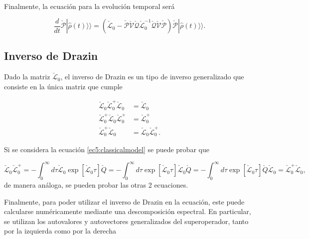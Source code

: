 \begin{appendixs}
Finalmente, la ecuación para la evolución temporal será 

\begin{equation*}
    \frac{d}{dt}\check{\mathcal{P}}|\hat{\rho}(t)\rangle \rangle = (\check{\mathcal{L}}_{0} - \check{\mathcal{P}}\check{\mathcal{V}}\check{\mathcal{Q}}\check{\mathcal{L}}^{-1}_{0}\check{\mathcal{Q}}\check{\mathcal{V}}\check{\mathcal{P}})\check{\mathcal{P}}|\hat{\rho}(t)\rangle \rangle. 
\end{equation*}



\label{appendix5clasic}

\subsection{ Inverso de Drazin }
Dado la matriz $\check{\mathcal{L}}_{0}$, el inverso de Drazin es un tipo de inverso generalizado que consiste en la única matriz que cumple 

\begin{align*}
    \check{\mathcal{L}}_{0}\check{\mathcal{L}}_{0}^{+}\check{\mathcal{L}}_{0} & = \check{\mathcal{L}}_{0} \\
    \check{\mathcal{L}}_{0}^{+}\check{\mathcal{L}}_{0}\check{\mathcal{L}}_{0}^{+} & = \check{\mathcal{L}}_{0}^{+} \\
    \check{\mathcal{L}}_{0}^{+}\check{\mathcal{L}}_{0} & = \check{\mathcal{L}}_{0}\check{\mathcal{L}}_{0}^{+}.
\end{align*}

Si se considera la ecuación \ref{ec5:classicalmodel} se puede probar que 

\begin{equation*}
    \check{\mathcal{L}}_{0}\check{\mathcal{L}}_{0}^{+} = - \int_{0}^{\infty}d\tau \check{\mathcal{L}}_{0}\exp[ \check{\mathcal{L}}_{0}\tau] \check{Q}= - \int_{0}^{\infty}d\tau \exp[ \check{\mathcal{L}}_{0}\tau]\check{\mathcal{L}}_{0} \check{Q} = - \int_{0}^{\infty}d\tau \exp[ \check{\mathcal{L}}_{0}\tau] \check{Q} \check{\mathcal{L}}_{0} = \check{\mathcal{L}}_{0}^{+}\check{\mathcal{L}}_{0},
\end{equation*}
de manera análoga, se pueden probar las otras 2 ecuaciones.

Finalmente, para poder utilizar el inverso de Drazin en la ecuación, este puede calcularse numéricamente mediante una descomposición espectral. En particular, se utilizan los autovalores y autovectores generalizados del superoperador, tanto por la izquierda como por la derecha


\end{appendixs}
